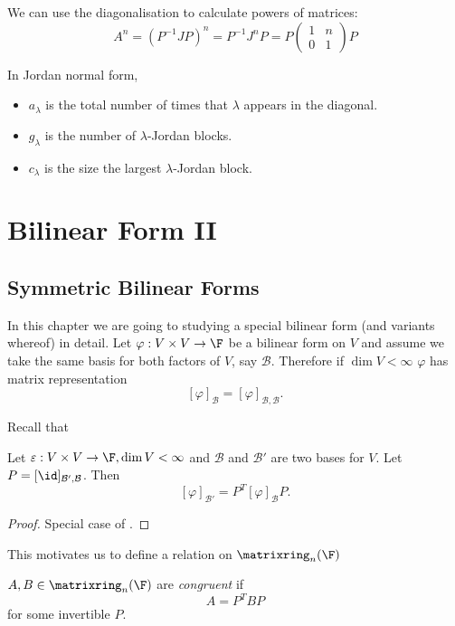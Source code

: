 \documentclass[a4paper]{article}
\newcommand*{\M}{\matrixring}
\newcommand*{\basis}{\mathcal}
\theoremstyle{definition}
\begin{document}
We can use the diagonalisation to calculate powers of matrices:
\[
  A^n = (P^{-1}JP)^n = P^{-1}J^nP = P
  \begin{pmatrix}
    1 & n \\
    0 & 1
  \end{pmatrix}
  P
\]

\begin{remark}
  In Jordan normal form,
  \begin{itemize}
  \item \(a_\lambda\) is the total number of times that \(\lambda\) appears in the diagonal.
  \item \(g_\lambda\) is the number of \(\lambda\)-Jordan blocks.
  \item \(c_\lambda\) is the size the largest \(\lambda\)-Jordan block.
  \end{itemize}
\end{remark}

\section{Bilinear Form II}

\subsection{Symmetric Bilinear Forms}

In this chapter we are going to studying a special bilinear form (and variants whereof) in detail. Let \(\varphi: V \times V \to \F\) be a bilinear form on \(V\) and assume we take the same basis for both factors of \(V\), say \(\basis B\). Therefore if \(\dim V < \infty\) \(\varphi\) has matrix representation
\[
  [\varphi]_{\basis B} = [\varphi]_{\basis B, \basis B}.
\]

Recall that
\begin{lemma}
  Let \(\varepsilon: V \times V \to \F, \dim V < \infty\) and \(\basis B\) and \(\basis B'\) are two bases for \(V\). Let \(P = [\id]_{\basis B', \basis B}\). Then
  \[
    [\varphi]_{\basis B'} = P^T[\varphi]_{\basis B}P.
  \]
\end{lemma}

\begin{proof}
  Special case of .
\end{proof}

This motivates us to define a relation on \(\M_n(\F)\)

\begin{definition}[Congruency]
  \(A, B \in \M_n(\F)\) are \emph{congruent} if
  \[
    A = P^TBP
  \]
  for some invertible \(P\).
\end{definition}
\end{document}

